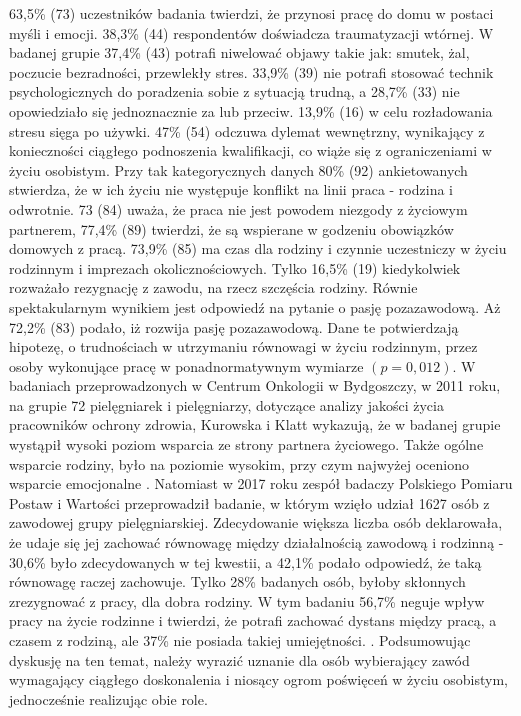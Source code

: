 \documentclass[a4paper,12pt,twoside,openright]{mwrep}
\begin{document}
 
  63,5\%  (73)  uczestników badania twierdzi, że przynosi pracę do domu w postaci myśli i emocji. 38,3\% (44) respondentów doświadcza traumatyzacji wtórnej. W badanej grupie 37,4\%  (43) potrafi niwelować objawy takie jak: smutek, żal, poczucie bezradności, przewlekły stres. 33,9\%  (39) nie potrafi stosować technik psychologicznych do poradzenia sobie z sytuacją trudną, a 28,7\%  (33) nie opowiedziało się jednoznacznie za lub przeciw. 13,9\% (16) w celu rozładowania stresu sięga po używki. 47\% (54) odczuwa dylemat wewnętrzny, wynikający z konieczności ciągłego podnoszenia kwalifikacji, co wiąże się z ograniczeniami w życiu osobistym. Przy tak kategorycznych danych 80\% (92) ankietowanych stwierdza, że w ich życiu nie występuje konflikt na linii praca - rodzina i odwrotnie. 73 (84) uważa, że praca nie jest powodem niezgody z życiowym partnerem, 77,4\%  (89) twierdzi, że są wspierane w godzeniu obowiązków domowych z pracą. 73,9\% (85) ma czas dla rodziny i czynnie uczestniczy w życiu rodzinnym i imprezach okolicznościowych. Tylko 16,5\% (19) kiedykolwiek rozważało rezygnację z zawodu, na rzecz szczęścia rodziny. Równie spektakularnym wynikiem jest odpowiedź na pytanie o pasję pozazawodową. Aż 72,2\% (83) podało, iż rozwija pasję pozazawodową. Dane te potwierdzają hipotezę, o trudnościach w utrzymaniu równowagi  w życiu rodzinnym, przez osoby wykonujące pracę w ponadnormatywnym wymiarze  $( p=0,012)$. W badaniach  przeprowadzonych w Centrum Onkologii w Bydgoszczy, w 2011 roku, na grupie 72 pielęgniarek i pielęgniarzy, dotyczące analizy jakości życia pracowników ochrony zdrowia, Kurowska i Klatt  wykazują, że w badanej grupie wystąpił wysoki poziom wsparcia ze strony partnera życiowego. Także ogólne wsparcie rodziny, było na poziomie wysokim, przy czym najwyżej oceniono wsparcie emocjonalne \cite{poziom}. Natomiast w 2017 roku zespół badaczy Polskiego Pomiaru Postaw i Wartości przeprowadził badanie, w którym wzięło udział 1627 osób z zawodowej grupy pielęgniarskiej. Zdecydowanie większa liczba osób deklarowała, że udaje się jej zachować równowagę między działalnością zawodową i rodzinną - 30,6\% było zdecydowanych w tej kwestii, a 42,1\% podało odpowiedź, że taką równowagę raczej zachowuje. Tylko 28\% badanych osób, byłoby skłonnych zrezygnować z pracy, dla dobra rodziny. W tym badaniu  56,7\% neguje wpływ pracy na życie rodzinne i twierdzi, że potrafi zachować dystans między pracą, a czasem z rodziną, ale 37\% nie posiada takiej umiejętności. \cite{komunikat}.
Podsumowując dyskusję na ten temat, należy wyrazić uznanie dla osób wybierający zawód wymagający ciągłego doskonalenia i niosący ogrom poświęceń w życiu osobistym, jednocześnie realizując obie role.
\end{document}
